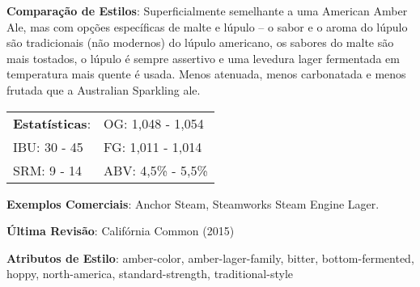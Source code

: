 \textbf{Comparação de Estilos}: Superficialmente semelhante a uma American Amber Ale, mas com opções específicas de malte e lúpulo – o sabor e o aroma do lúpulo são tradicionais (não modernos) do lúpulo americano, os sabores do malte são mais tostados, o lúpulo é sempre assertivo e uma levedura lager fermentada em temperatura mais quente é usada. Menos atenuada, menos carbonatada e menos frutada que a Australian Sparkling ale.

\begin{tabular}{@{}p{35mm}p{35mm}@{}}
  \textbf{Estatísticas}: & OG: 1,048 - 1,054 \\
  IBU: 30 - 45  & FG: 1,011 - 1,014  \\
  SRM: 9 - 14  & ABV: 4,5\% - 5,5\%
\end{tabular}

\textbf{Exemplos Comerciais}: Anchor Steam, Steamworks Steam Engine Lager.

\textbf{Última Revisão}: Califórnia Common (2015)

\textbf{Atributos de Estilo}: amber-color, amber-lager-family, bitter, bottom-fermented, hoppy, north-america, standard-strength, traditional-style

